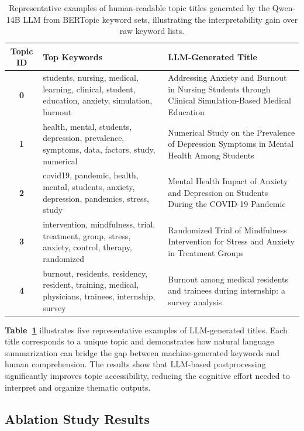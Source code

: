 \documentclass[authorproof,JACIII,researchpaper]{fujipressarticle}
\begin{document}
\begin{table}[!t]
\centering
\caption{Representative examples of human-readable topic titles generated by the Qwen-14B LLM from BERTopic keyword sets, illustrating the interpretability gain over raw keyword lists.}
\label{tab:topic_labels}
\footnotesize
\begin{tabular}{c p{5.5cm} p{8cm}}
\hline
\textbf{Topic ID} & \textbf{Top Keywords} & \textbf{LLM-Generated Title} \\
\hline
\textbf{0} & students, nursing, medical, learning, clinical, student, education, anxiety, simulation, burnout & Addressing Anxiety and Burnout in Nursing Students through Clinical Simulation-Based Medical Education \\
\hline
\textbf{1} & health, mental, students, depression, prevalence, symptoms, data, factors, study, numerical & Numerical Study on the Prevalence of Depression Symptoms in Mental Health Among Students \\
\hline
\textbf{2} & covid19, pandemic, health, mental, students, anxiety, depression, pandemics, stress, study & Mental Health Impact of Anxiety and Depression on Students During the COVID-19 Pandemic \\
\hline
\textbf{3} & intervention, mindfulness, trial, treatment, group, stress, anxiety, control, therapy, randomized & Randomized Trial of Mindfulness Intervention for Stress and Anxiety in Treatment Groups \\
\hline
\textbf{4} & burnout, residents, residency, resident, training, medical, physicians, trainees, internship, survey & Burnout among medical residents and trainees during internship: a survey analysis \\
\hline
\end{tabular}
\end{table}

\textbf{Table~\ref{tab:topic_labels}} illustrates five representative examples of LLM-generated titles. Each title corresponds to a unique topic and demonstrates how natural language summarization can bridge the gap between machine-generated keywords and human comprehension. The results show that LLM-based postprocessing significantly improves topic accessibility, reducing the cognitive effort needed to interpret and organize thematic outputs.

\subsection{Ablation Study Results}
\end{document}

